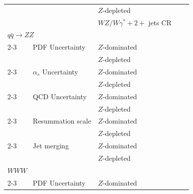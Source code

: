 \begin{table}[ht!]
{\begin{tabular}{llrl}
                                                                                                       & $Z$-depleted   \\
                                                                                                       & $WZ/W\gamma^{*}+2+$ jets CR  \\                                                                                                 
    \hline
    $q\bar{q} \to ZZ$ & & & \\
    \cline{2-3}
    ~~~~PDF Uncertainty                                                                                & $Z$-dominated   \\
                                                                                                       & $Z$-depleted    \\
    \cline{2-3}                                                                                               
    ~~~~$\alpha_{s}$ Uncertainty                                                                       & $Z$-dominated   \\
                                                                                                       & $Z$-depleted   \\
    \cline{2-3}                                                                                               
    ~~~~QCD Uncertainty                                                                                & $Z$-dominated   \\
                                                                                                       & $Z$-depleted    \\
    \cline{2-3}
    ~~~~Resummation scale                                                                              & $Z$-dominated \\
                                                                                                       & $Z$-depleted    \\
    \cline{2-3}
    ~~~~Jet merging                                                                                    & $Z$-dominated   \\
                                                                                                       & $Z$-depleted    \\
    \hline
    $WWW$ & & & \\
    \cline{2-3}
    ~~~~PDF Uncertainty                                                                                & $Z$-dominated   \\

\end{tabular}}
\end{table}
